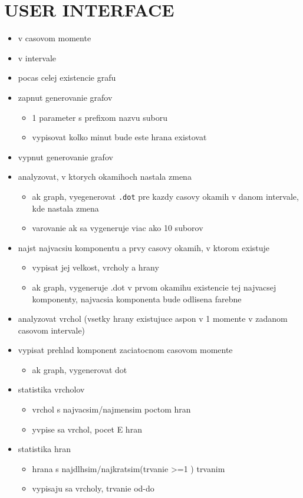 \documentclass[11pt, a4paper,draft]{article}
\theoremstyle{plain}
\theoremstyle{definition}
\theoremstyle{remark}
\begin{document}
\section{USER INTERFACE}

\begin{itemize}
    \item v casovom momente
    \item v intervale
    \item pocas celej existencie grafu

    \item zapnut generovanie grafov
        \begin{itemize}
             \item 1 parameter s prefixom nazvu suboru
             \item vypisovat kolko minut bude este hrana existovat
         \end{itemize}
    \item vypnut generovanie grafov

    \item analyzovat, v ktorych okamihoch nastala zmena
        \begin{itemize}
            \item ak graph, vyegenerovat \texttt{.dot} pre kazdy casovy okamih v danom intervale, kde nastala zmena
             \item varovanie ak sa vygeneruje viac ako 10 suborov
         \end{itemize}
    \item najst najvacsiu komponentu a prvy casovy okamih, v ktorom existuje
        \begin{itemize}
              \item vypisat jej velkost, vrcholy a hrany
              \item ak graph, vygeneruje .dot v prvom okamihu existencie tej najvacsej komponenty, najvacsia komponenta bude odlisena farebne
          \end{itemize}
    \item analyzovat vrchol (vsetky hrany existujuce aspon v 1 momente v zadanom casovom intervale)
    \item vypisat prehlad komponent zaciatocnom casovom momente
        \begin{itemize}
           \item ak graph, vygenerovat dot
        \end{itemize}
    \item statistika vrcholov
        \begin{itemize}
          \item vrchol s najvacsim/najmensim poctom hran
          \item yvpise sa vrchol, pocet E hran
      \end{itemize}
    \item statistika hran
        \begin{itemize}
          \item hrana s najdlhsim/najkratsim(trvanie >=1 ) trvanim
          \item vypisaju sa vrcholy, trvanie od-do
        \end{itemize}
\end{itemize}
\end{document}
